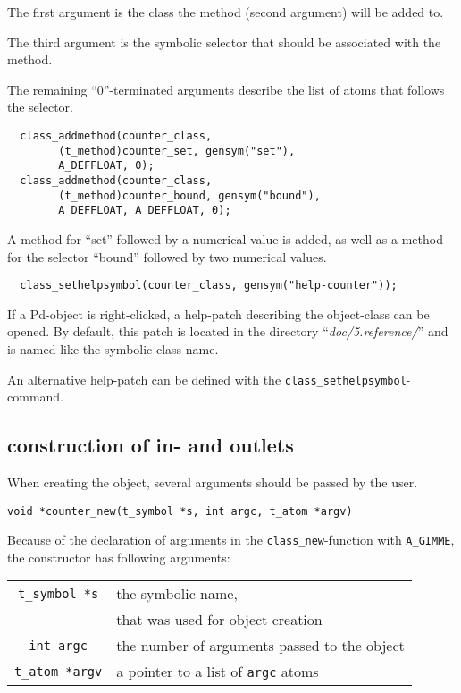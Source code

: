 \documentclass[12pt, a4paper,english,titlepage]{article}
\begin{document}
The first argument is the class the method (second argument) will be added to.

The third argument is the symbolic selector that should be associated with the method.

The remaining ``0''-terminated arguments describe the list of atoms that
follows the selector.

\begin{verbatim}
  class_addmethod(counter_class,
        (t_method)counter_set, gensym("set"),
        A_DEFFLOAT, 0);
  class_addmethod(counter_class,
        (t_method)counter_bound, gensym("bound"),
        A_DEFFLOAT, A_DEFFLOAT, 0);
\end{verbatim}

A method for ``set'' followed by a numerical value is added,
as well as a method for the selector ``bound'' followed by two numerical values.

\begin{verbatim}
  class_sethelpsymbol(counter_class, gensym("help-counter"));
\end{verbatim}

If a Pd-object is right-clicked, a help-patch describing the object-class can be opened.
By default, this patch is located in the directory ``{\em doc/5.reference/}'' and
is named like the symbolic class name.

An alternative help-patch can be defined with the 
\verb+class_sethelpsymbol+-command.

\subsection{construction of in- and outlets}

When creating the object, several arguments should be passed by the user.

\begin{verbatim}
void *counter_new(t_symbol *s, int argc, t_atom *argv)
\end{verbatim}
Because of the declaration of arguments in the \verb+class_new+-function
with \verb+A_GIMME+,
the constructor has following arguments:

\begin{tabular}{c|l}
\verb+t_symbol *s+ & the symbolic name,\\
& that was used for object creation \\
\verb+int argc+ & the number of arguments passed to the object\\
\verb+t_atom *argv+ & a pointer to a list of {\tt argc} atoms
\end{tabular}
\end{document}

